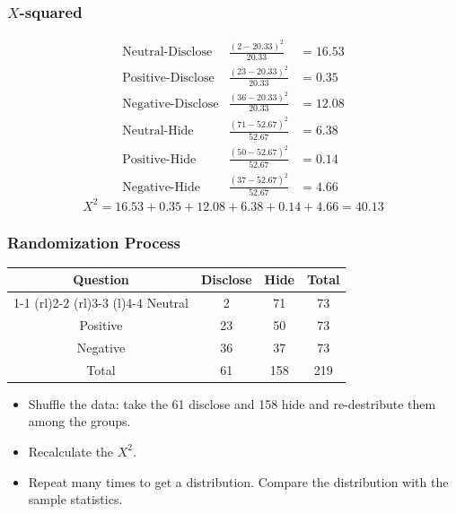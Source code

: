 \documentclass{beamer}
\begin{document}
\begin{frame}
  \frametitle{$X$-squared}
  \begin{displaymath}
    \begin{array}{lll}
      \text{Neutral-Disclose} & \frac{(2 - 20.33)^2}{20.33} & = 16.53
      \\[0.5em]
      \text{Positive-Disclose} & \frac{(23 - 20.33)^2}{20.33} & = 0.35
      \\[0.5em]
      \text{Negative-Disclose} & \frac{(36 - 20.33)^2}{20.33} & =
      12.08 \\[0.5em]
      \text{Neutral-Hide} & \frac{(71 - 52.67)^2}{52.67} & = 6.38
      \\[0.5em]
      \text{Positive-Hide} & \frac{(50 - 52.67)^2}{52.67} & = 0.14
      \\[0.5em]
      \text{Negative-Hide} & \frac{(37 - 52.67)^2}{52.67} & = 4.66
    \end{array}
  \end{displaymath}
  \begin{equation*}
    X^2 = 16.53 + 0.35 + 12.08 + 6.38 + 0.14 + 4.66 = 40.13
  \end{equation*}
\end{frame}

\begin{frame}
  \frametitle{Randomization Process}
  \begin{table}
    \begin{tabular}{@{}cccc@{}}
      \toprule
      Question & Disclose & Hide & Total \\
      \cmidrule(r){1-1} \cmidrule(rl){2-2} \cmidrule(rl){3-3}
      \cmidrule(l){4-4}
      Neutral & 2 & 71 & 73 \\[0.3em]
      Positive & 23 & 50 & 73 \\[0.3em]
      Negative & 36 & 37 & 73 \\
      Total & 61 & 158 & 219 \\
      \bottomrule
    \end{tabular}
  \end{table}
  \begin{itemize}
    \item[] 
      Shuffle the data: take the 61 disclose and 158 hide and
      re-destribute them among the groups. 
      \vspace{0.5cm}
    \item[] 
      Recalculate the $X^2$.
      \vspace{0.5cm}
    \item[] 
      Repeat many times to get a distribution. Compare the
      distribution with the sample statistics. 
  \end{itemize}
\end{frame}
\end{document}

